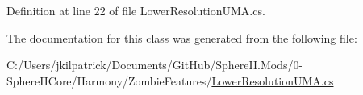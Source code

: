 Definition at line 22 of file Lower\+Resolution\+U\+M\+A.\+cs.



The documentation for this class was generated from the following file\+:\begin{DoxyCompactItemize}
\item 
C\+:/\+Users/jkilpatrick/\+Documents/\+Git\+Hub/\+Sphere\+I\+I.\+Mods/0-\/\+Sphere\+I\+I\+Core/\+Harmony/\+Zombie\+Features/\mbox{\hyperlink{_lower_resolution_u_m_a_8cs}{Lower\+Resolution\+U\+M\+A.\+cs}}\end{DoxyCompactItemize}
